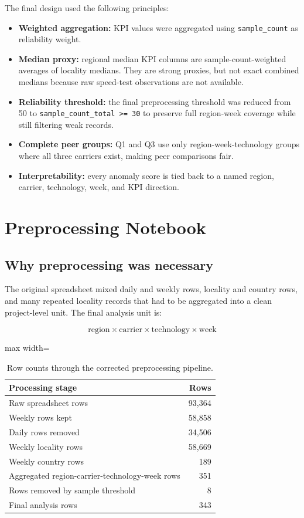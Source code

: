 \documentclass[12pt,a4paper]{article}
\begin{document}
The final design used the following principles:

\begin{itemize}
    \item \textbf{Weighted aggregation:} KPI values were aggregated using \texttt{sample\_count} as reliability weight.
    \item \textbf{Median proxy:} regional median KPI columns are sample-count-weighted averages of locality medians. They are strong proxies, but not exact combined medians because raw speed-test observations are not available.
    \item \textbf{Reliability threshold:} the final preprocessing threshold was reduced from 50 to \texttt{sample\_count\_total >= 30} to preserve full region-week coverage while still filtering weak records.
    \item \textbf{Complete peer groups:} Q1 and Q3 use only region-week-technology groups where all three carriers exist, making peer comparisons fair.
    \item \textbf{Interpretability:} every anomaly score is tied back to a named region, carrier, technology, week, and KPI direction.
\end{itemize}

\section{Preprocessing Notebook}

\subsection{Why preprocessing was necessary}

The original spreadsheet mixed daily and weekly rows, locality and country rows, and many repeated locality records that had to be aggregated into a clean project-level unit. The final analysis unit is:

\[
\text{region} \times \text{carrier} \times \text{technology} \times \text{week}
\]

\begin{table}[htbp]
\centering
\begin{adjustbox}{max width=\textwidth}
\begin{tabular}{p{9cm}r}
\toprule
Processing stage & Rows \\
\midrule
Raw spreadsheet rows & 93,364 \\
Weekly rows kept & 58,858 \\
Daily rows removed & 34,506 \\
Weekly locality rows & 58,669 \\
Weekly country rows & 189 \\
Aggregated region-carrier-technology-week rows & 351 \\
Rows removed by sample threshold & 8 \\
Final analysis rows & 343 \\
\bottomrule
\end{tabular}
\end{adjustbox}
\caption{Row counts through the corrected preprocessing pipeline.}
\label{tab:preprocess}
\end{table}
\end{document}
